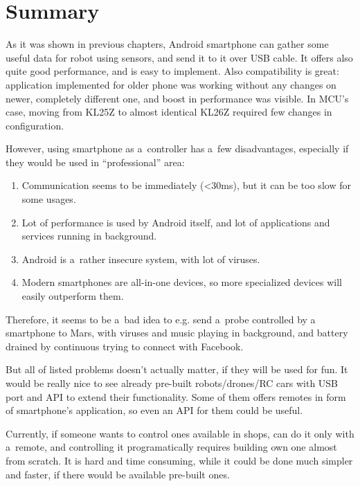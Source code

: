 \chapter{Summary}
As it was shown in previous chapters, Android smartphone can gather some useful
data for robot using sensors, and send it to it over USB cable.
It offers also quite good performance, and is easy to implement. 
Also compatibility is great: application implemented for older phone was working
without any changes on newer, completely different one, and boost in performance
was visible.
In MCU's case, moving from KL25Z to almost identical KL26Z required few changes
in configuration.

However, using smartphone as a~controller has a~few disadvantages, especially if
they would be used in ``professional'' area:
\begin{enumerate}
  \item Communication seems to be immediately (<30ms), but it can be too slow
  	for some usages.
  \item Lot of performance is used by Android itself, and lot of applications
  	and services running in background.
  \item Android is a~rather insecure system, with lot of viruses.
  \item Modern smartphones are all-in-one devices, so more specialized devices
  	will easily outperform them.
\end{enumerate}
Therefore, it seems to be a~bad idea to e.g. send a~probe controlled by a
smartphone to Mars, with viruses and music playing in background, and battery
drained by continuous trying to connect with Facebook.

But all of listed problems doesn't actually matter, if they will be used for
fun.
It would be really nice to see already pre-built robots/drones/RC cars with USB
port and API to extend their functionality.
Some of them offers remotes in form of smartphone's application, so even an API
for them could be useful.

Currently, if someone wants to control ones available in shops, can do it only
with a~remote, and controlling it programatically requires building own one
almost from scratch.
It is hard and time consuming, while it could be done much simpler and faster,
if there would be available pre-built ones.

